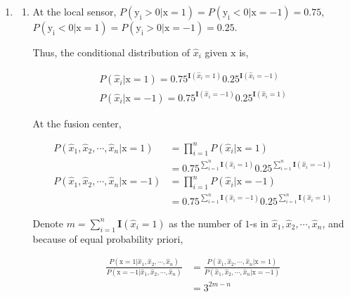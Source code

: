 \documentclass[a4paper]{article}
\begin{document}
\begin{enumerate}
\item \begin{enumerate}
  \item 
  At the local sensor,  $P(\mathrm{y_i} >0 | \mathrm{x}=1) = P(\mathrm{y_i} <0 | \mathrm{x}=-1)= 0.75$, 
  $P(\mathrm{y_i} <0 | \mathrm{x}=1)= P(\mathrm{y_i} >0 | \mathrm{x}=-1)= 0.25$.
  
  Thus, the conditional distribution of $\hat x_i$ given $\mathrm{x}$ is,

  \begin{equation}
    \begin{aligned}
      P(\hat x_i |\mathrm{x}=1 ) = 0.75^{\mathbf{I}(\hat x_i =1)} 0.25^{\mathbf{I}(\hat x_i =-1)} \\
      P(\hat x_i |\mathrm{x}=-1 ) = 0.75^{\mathbf{I}(\hat x_i =-1)} 0.25^{\mathbf{I}(\hat x_i =1)}
    \end{aligned}
  \end{equation}


At the fusion center, 

\begin{equation}
  \begin{aligned}
    P(\hat x_1, \hat x_2, \cdots, \hat x_n |\mathrm{x}=1 ) &= \prod_{i=1}^n  P(\hat x_i |\mathrm{x}=1 ) \\
    & = 0.75^{\sum_{i=1}^n \mathbf{I}(\hat x_i =1)} 0.25^{\sum_{i=1}^n \mathbf{I}(\hat x_i =-1)}\\
    P(\hat x_1, \hat x_2, \cdots, \hat x_n |\mathrm{x}=-1 ) &= \prod_{i=1}^n  P(\hat x_i |\mathrm{x}=-1 ) \\
    & = 0.75^{\sum_{i=1}^n \mathbf{I}(\hat x_i =-1)} 0.25^{\sum_{i=1}^n \mathbf{I}(\hat x_i =1)}
  \end{aligned}
\end{equation}

Denote $ m = \sum_{i=1}^n \mathbf{I}(\hat x_i =1)$ as the number of $1$-s in $\hat x_1, \hat x_2, \cdots, \hat x_n$, and because of equal probability priori,

\begin{equation}
  \begin{aligned}
    \frac{ P(\mathrm{x}=1 | \hat x_1, \hat x_2, \cdots, \hat x_n  )}{ P(\mathrm{x}=-1 | \hat x_1, \hat x_2, \cdots, \hat x_n  )} & = \frac{ P(\hat x_1, \hat x_2, \cdots, \hat x_n |\mathrm{x}=1 )}{ P(\hat x_1, \hat x_2, \cdots, \hat x_n |\mathrm{x}=-1 )}  \\
    & = 3^{2m-n}
  \end{aligned}
\end{equation}


\end{enumerate}
\end{enumerate}
\end{document}
